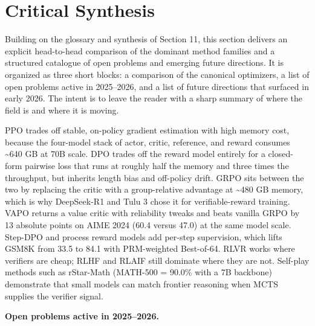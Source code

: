\documentclass{article}
\begin{document}
\section{Critical Synthesis}\label{critical-synthesis}

Building on the glossary and synthesis of Section 11, this section delivers an explicit head-to-head comparison of the dominant method families and a structured catalogue of open problems and emerging future directions. It is organized as three short blocks: a comparison of the canonical optimizers, a list of open problems active in 2025--2026, and a list of future directions that surfaced in early 2026. The intent is to leave the reader with a sharp summary of where the field is and where it is moving.

PPO trades off stable, on-policy gradient estimation with high memory cost, because the four-model stack of actor, critic, reference, and reward consumes \textasciitilde640 GB at 70B scale. DPO trades off the reward model entirely for a closed-form pairwise loss that runs at roughly half the memory and three times the throughput, but inherits length bias and off-policy drift. GRPO sits between the two by replacing the critic with a group-relative advantage at \textasciitilde480 GB memory, which is why DeepSeek-R1 and Tulu 3 chose it for verifiable-reward training. VAPO returns a value critic with reliability tweaks and beats vanilla GRPO by 13 absolute points on AIME 2024 (60.4 versus 47.0) at the same model scale. Step-DPO and process reward models add per-step supervision, which lifts GSM8K from 33.5 to 84.1 with PRM-weighted Best-of-64. RLVR works where verifiers are cheap; RLHF and RLAIF still dominate where they are not. Self-play methods such as rStar-Math (MATH-500 = 90.0\% with a 7B backbone) demonstrate that small models can match frontier reasoning when MCTS supplies the verifier signal.

\textbf{Open problems active in 2025--2026.}
\end{document}

